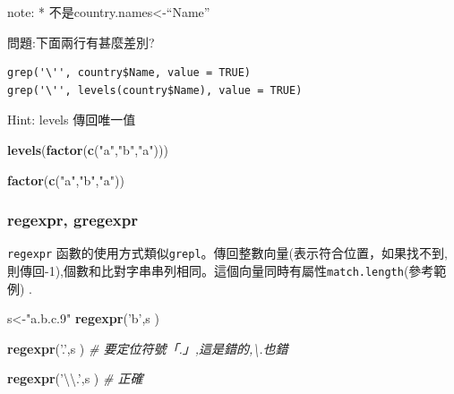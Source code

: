 \documentclass[]{book}
\newenvironment{Shaded}{\begin{snugshade}}{\end{snugshade}}
\newcommand{\KeywordTok}[1]{\textcolor[rgb]{0.13,0.29,0.53}{\textbf{#1}}}
\newcommand{\CharTok}[1]{\textcolor[rgb]{0.31,0.60,0.02}{#1}}
\newcommand{\StringTok}[1]{\textcolor[rgb]{0.31,0.60,0.02}{#1}}
\newcommand{\CommentTok}[1]{\textcolor[rgb]{0.56,0.35,0.01}{\textit{#1}}}
\newcommand{\NormalTok}[1]{#1}
\theoremstyle{definition}
\theoremstyle{definition}
\theoremstyle{definition}
\theoremstyle{remark}
\begin{document}
note: * 不是country.names\textless{}-``Name''

問題:下面兩行有甚麼差別?

\begin{verbatim}
grep('\'', country$Name, value = TRUE)
grep('\'', levels(country$Name), value = TRUE)
\end{verbatim}

Hint: levels 傳回唯一值

\begin{Shaded}
\begin{Highlighting}[]
\KeywordTok{levels}\NormalTok{(}\KeywordTok{factor}\NormalTok{(}\KeywordTok{c}\NormalTok{(}\StringTok{"a"}\NormalTok{,}\StringTok{"b"}\NormalTok{,}\StringTok{"a"}\NormalTok{)))}
\end{Highlighting}
\end{Shaded}

\begin{Shaded}
\begin{Highlighting}[]
\KeywordTok{factor}\NormalTok{(}\KeywordTok{c}\NormalTok{(}\StringTok{"a"}\NormalTok{,}\StringTok{"b"}\NormalTok{,}\StringTok{"a"}\NormalTok{))}
\end{Highlighting}
\end{Shaded}

\subsubsection{regexpr, gregexpr}\label{regexpr-gregexpr}

\texttt{regexpr}
函數的使用方式類似\texttt{grepl}。傳回整數向量(表示符合位置，如果找不到,則傳回-1),個數和比對字串串列相同。這個向量同時有屬性\texttt{match.length}(參考範例)
.

\begin{Shaded}
\begin{Highlighting}[]
\NormalTok{s<-}\StringTok{"a.b.c.9"}
\KeywordTok{regexpr}\NormalTok{(}\StringTok{'b'}\NormalTok{,s )}
\end{Highlighting}
\end{Shaded}

\begin{Shaded}
\begin{Highlighting}[]
\KeywordTok{regexpr}\NormalTok{(}\StringTok{'.'}\NormalTok{,s ) }\CommentTok{# 要定位符號「.」,這是錯的,\textbackslash{}.也錯}
\end{Highlighting}
\end{Shaded}

\begin{Shaded}
\begin{Highlighting}[]
\KeywordTok{regexpr}\NormalTok{(}\StringTok{'}\CharTok{\textbackslash{}\textbackslash{}}\StringTok{.'}\NormalTok{,s ) }\CommentTok{# 正確}
\end{Highlighting}
\end{Shaded}
\end{document}
